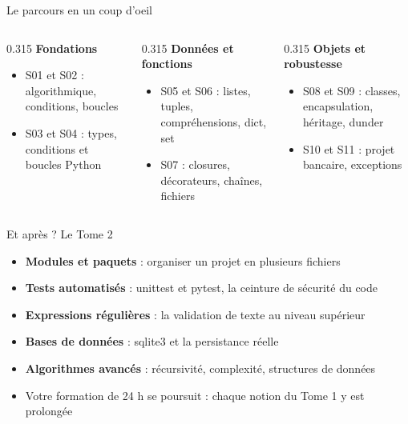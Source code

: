 \documentclass[aspectratio=169,11pt]{beamer}
\begin{document}
\begin{frame}{Le parcours en un coup d'oeil}
\begin{columns}[t]
\begin{column}{0.315\textwidth}
{\bfseries\color{PyBleu}Fondations}

\begin{itemize}
  \setlength{\itemsep}{1.5pt}\setlength{\parskip}{0pt}
  \item S01 et S02 : algorithmique, conditions, boucles
  \item S03 et S04 : types, conditions et boucles Python
\end{itemize}
\end{column}
\hspace{0.015\textwidth}
\begin{column}{0.315\textwidth}
{\bfseries\color{PyBleu}Données et fonctions}

\begin{itemize}
  \setlength{\itemsep}{1.5pt}\setlength{\parskip}{0pt}
  \item S05 et S06 : listes, tuples, compréhensions, dict, set
  \item S07 : closures, décorateurs, chaînes, fichiers
\end{itemize}
\end{column}
\hspace{0.015\textwidth}
\begin{column}{0.315\textwidth}
{\bfseries\color{PyBleu}Objets et robustesse}

\begin{itemize}
  \setlength{\itemsep}{1.5pt}\setlength{\parskip}{0pt}
  \item S08 et S09 : classes, encapsulation, héritage, dunder
  \item S10 et S11 : projet bancaire, exceptions
\end{itemize}
\end{column}
\end{columns}
\end{frame}

\begin{frame}{Et après ? Le Tome 2}
\begin{itemize}
  \item \textbf{Modules et paquets} : organiser un projet en plusieurs fichiers
  \item \textbf{Tests automatisés} : unittest et pytest, la ceinture de sécurité du code
  \item \textbf{Expressions régulières} : la validation de texte au niveau supérieur
  \item \textbf{Bases de données} : sqlite3 et la persistance réelle
  \item \textbf{Algorithmes avancés} : récursivité, complexité, structures de données
  \item Votre formation de 24 h se poursuit : chaque notion du Tome 1 y est prolongée
\end{itemize}
\end{frame}
\end{document}
